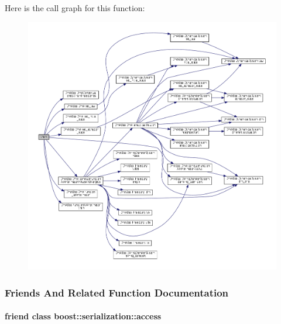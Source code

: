 Here is the call graph for this function\+:
\nopagebreak
\begin{figure}[H]
\begin{center}
\leavevmode
\includegraphics[width=350pt]{classDmpBbo_1_1DmpContextualOneStep_abc482e476a06b3c3c3816472f309dbd3_cgraph}
\end{center}
\end{figure}




\subsubsection{Friends And Related Function Documentation}
\hypertarget{classDmpBbo_1_1DmpContextualOneStep_ac98d07dd8f7b70e16ccb9a01abf56b9c}{
\paragraph[{boost\+::serialization\+::access}]{\setlength{\rightskip}{0pt plus 5cm}friend class boost\+::serialization\+::access\hspace{0.3cm}{\ttfamily [friend]}}}\label{classDmpBbo_1_1DmpContextualOneStep_ac98d07dd8f7b70e16ccb9a01abf56b9c}


